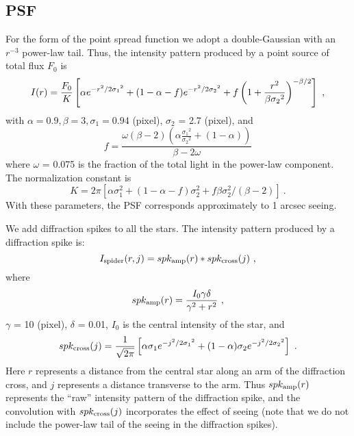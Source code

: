 \vspace{10pt}
\subsection{ PSF }

For the form of the point spread function we adopt a
double-Gaussian with an $r^{-3}$ power-law tail.
Thus, the intensity pattern produced by a point source of total flux $F_0$ is
\begin{equation}
I(r) = {F_0 \over K}
       \left[ \alpha e^{-{r^2}/2{\sigma_1}^2}
       + (1 - \alpha - f) e^{-{r^2}/2{\sigma_2}^2}
       + f\left(1 + \frac{r^2}{\beta {{\sigma}_2}^2}\right)^{-\beta/2}\right] ~,
\end{equation}
with 
$\alpha = 0.9, \beta = 3, \sigma_1 = 0.94$ (pixel), 
$\sigma_2$ = 2.7 (pixel), and
\begin{equation}
f = \frac{\omega (\beta - 2)(\alpha \frac{{\sigma_1}^2}{{\sigma_2}^2} +
    (1 - \alpha))}{\beta - 2 \omega}
\end{equation}
where $\omega$ = 0.075 is the fraction of the total
light in the power-law component.
The normalization constant is
\begin{equation}
K = 2\pi\left[\alpha\sigma_1^2 + (1-\alpha-f)\sigma_2^2 +
        f\beta\sigma_2^2/(\beta-2)\right] ~.
\end{equation}
With these parameters,
the PSF corresponds approximately to 1 arcsec seeing.

We add diffraction spikes to all the stars.
The intensity pattern produced by a diffraction spike is:
\begin{equation}
I_{\rm spider}(r,j) = spk_{\rm amp}(r) * spk_{\rm cross}(j) ~,
\end{equation}
where
\begin{equation}
spk_{\rm amp}(r) = \frac{I_0 \gamma \delta }{\gamma^2 + r^2} ~,
\end{equation}
$\gamma$ = 10 (pixel), $\delta$ = 0.01, $I_0$ is the central intensity 
of the star, and
\begin{equation}
spk_{\rm cross}(j) = \frac{1}{\sqrt{2 \pi}}
      \left[\alpha \sigma_1 e^{-j^2/2{\sigma_1}^2}
      + (1 - \alpha) \sigma_2 e^{-j^2/2{\sigma_2}^2}\right] ~.
\end{equation}
Here $r$ represents a distance from the central star along an arm of the
diffraction cross, and $j$ represents a distance transverse to the arm.
Thus $spk_{\rm amp}(r)$ represents the ``raw'' intensity pattern of the
diffraction spike, and the convolution with $spk_{\rm cross}(j)$
incorporates the effect of seeing (note that we do not include the
power-law tail of the seeing in the diffraction spikes).
 
